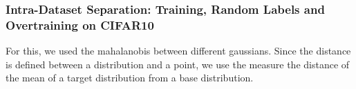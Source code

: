 \documentclass{article}
\begin{document}
                
            \subsubsection{Intra-Dataset Separation: Training, Random Labels and Overtraining on CIFAR10}
                For this, we used the mahalanobis between different gaussians. Since the distance is defined between a distribution and a point, we use the measure the distance of the mean of a target distribution from a base distribution. 
                
\end{document}
